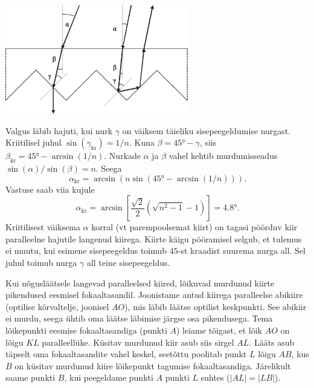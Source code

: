 \documentclass[10pt]{article}
\begin{document}
{%

\solu
\begin{center}
	\includegraphics[width=0.6\textwidth]{2010-v2g-08-hajuti_lah.eps}
\end{center}

Valgus läbib hajuti, kui nurk $\gamma$ on väiksem täieliku sisepeegeldumise nurgast. Kriitilisel juhul $\sin(\gamma_\mathrm{kr})=1/n$. Kuna $\beta=\ang{45}-\gamma$, siis $\beta_\mathrm{kr} = \ang{45}-\arcsin(1/n)$. Nurkade $\alpha$ ja $\beta$ vahel kehtib murdumisseadus $\sin(\alpha)/\sin(\beta)=n$. Seega
\[
\alpha_\mathrm{kr}=\arcsin(n\sin(\ang{45}-\arcsin(1/n))).
\]
Vastuse saab viia kujule
\[
\alpha_\mathrm{kr}=\arcsin\left[\frac{\sqrt2}{2}(\sqrt{n^2-1}-1)\right] = \ang{4.8}.
\]
Kriitilisest väiksema $\alpha$ korral (vt parempoolsemat kiirt) on tagasi pöörduv kiir paralleelne hajutile langenud kiirega. Kiirte käigu pööramisel selgub, et tulemus ei muutu, kui esimene sisepeegeldus toimub $45$-st kraadist suurema nurga all. Sel juhul toimub nurga $\gamma$ all teine sisepeegeldus.
\probend
\bigskip


\solu
Kui nõgusläätsele langevad paralleelsed kiired, lõikuvad
murdunud kiirte pikendused eesmisel fokaaltasandil. Joonistame antud kiirega paralleelse abikiire (optilise kõrvaltelje, joonisel $AO$), mis läbib läätse optilist keskpunkti. See abikiir ei murdu, seega ühtib oma läätse läbimise järgse osa pikendusega. Tema lõikepunkti eesmise fokaaltasandiga (punkti $A$) leiame tõigast, et lõik $AO$ on lõigu
$KL$ paralleellüke. Küsitav murdunud kiir asub siis sirgel $AL$. Lääts asub täpselt oma
fokaaltasandite vahel keskel, seetõttu poolitab punkt $L$ lõigu $AB$, kus $B$ on küsitav murdunud kiire lõikepunkt tagumise fokaaltasandiga. Järelikult saame punkti $B$, kui peegeldame punkti $A$ punkti $L$ suhtes ($|AL| = |LB|$).

}
\end{document}

